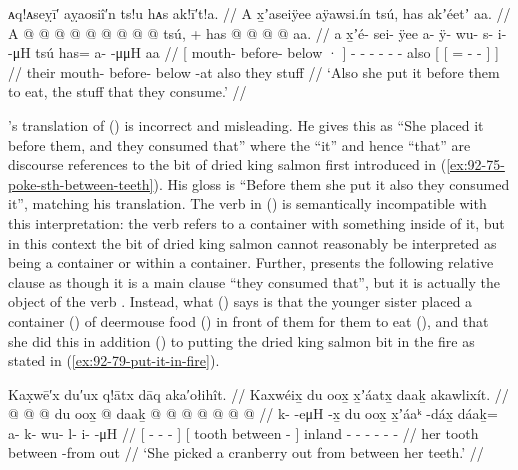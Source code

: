 \ex\label{ex:92-81-put-before-them-stuff-consume}%
%
\begingl
	\glpreamble	ᴀq!ᴀseỵī′ aỵaosiî′n ts!u hᴀs ak!ī′t!a. //
	\glpreamble	A x̱ʼaseiÿee aÿawsi.ín tsú, has akʼéetʼ aa. //
	\gla	{} A  @ {} @ {} @ {} {}
		 @ {} @ {} @ {} @ {} @ {} @ {}
		tsú, + {} {} has @  @ {} @ {} @ {} {} aa. {} //
	\glb	{} a x̱ʼé- sei- ÿee {} {}
		a- ÿ- wu- s- i-  -μH
		tsú {} {} has= a-  -μμH {} {} aa {} //
	\glc	{}[  mouth- before- below · {}]
		- - - - -  -
		also {}[ {}[ = -
			 - \· {}]  {}] //
	\gld	{} their mouth- before- below -at {}
		 {} {} {} {} {} {}
		also {} {} they  {} {} {} {}
			stuff {} //
	\glft	‘Also she put it before them to eat, the stuff that they consume.’
		//
\endgl
\xe

\citeauthor{swanton:1909}’s translation of (\lastx) is incorrect and misleading.
He gives this as “She placed it before them, and they consumed that” where the “it” and hence “that” are discourse references to the bit of dried king salmon first introduced in (\ref{ex:92-75-poke-sth-between-teeth}).
His gloss is “Before them she put it also they consumed it”, matching his translation.
The verb  in (\lastx) is semantically incompatible with this interpretation: the verb refers to a container with something inside of it, but in this context the bit of dried king salmon cannot reasonably be interpreted as being a container or within a container.
Further, \citeauthor{swanton:1909} presents the following relative clause  as though it is a main clause “they consumed that”, but it is actually the object of the verb .
Instead, what (\lastx) says is that the younger sister placed a container () of deermouse food () in front of them for them to eat (), and that she did this in addition () to putting the dried king salmon bit in the fire as stated in (\ref{ex:92-79-put-it-in-fire}).

\ex\label{ex:92-82-picked-cranberry-out}%
%
\begingl
	\glpreamble	Kax̣wē′x du′ux q!ātx dāq aka′ołihît. //
	\glpreamble	Kaxwéix̱ du oox̱ x̱ʼáatx̱ daaḵ akawlixít. //
	\gla	{}  @ {} @ {} @ {} {}
		{} du oox̱  @ {} {}
		daaḵ @  @ {} @ {} @ {} @ {} @ {} @ {} //
	\glb	{} k-  -eμH -x̱ {}
		{} du oox̱ x̱ʼáaᵏ -dáx̱ {}
		dáaḵ= a- k- wu- l- i-  -μH //
	\glc	{}[ -  - - {}]
		{}[  tooth between - {}]
		inland - - - - -
			 - //
	\gld	{}  {} {} {} {}
		{} her tooth between -from {}
		out  {} {} {} {} {} {} //
	\glft	‘She picked a cranberry out from between her teeth.’
		//
\endgl
\xe

